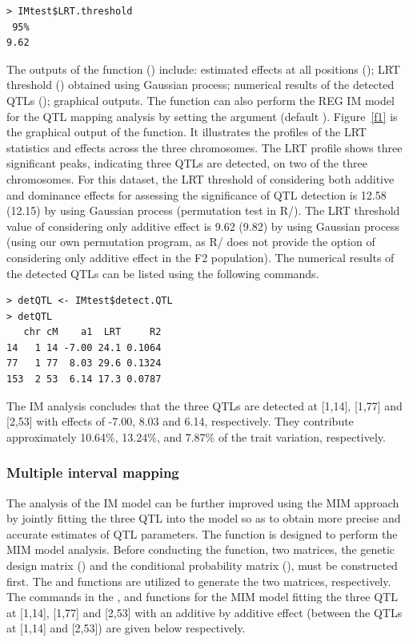 \begin{verbatim}
> IMtest$LRT.threshold
 95%
9.62
\end{verbatim}

\noindent The outputs of the  function () include: estimated effects at all positions ();  LRT threshold () obtained using Gaussian process; numerical results of the detected QTLs (); graphical outputs. The  function can also perform the REG IM model for the QTL mapping analysis by setting the argument  (default ). Figure~\ref{f1} is the graphical output of the  function. It illustrates the profiles of the LRT statistics and effects across the three chromosomes. The LRT profile shows three significant peaks, indicating three QTLs are detected, on two of the three chromosomes. For this dataset, the LRT threshold of considering both additive and dominance effects for assessing the significance of QTL detection is 12.58 (12.15) by using Gaussian process (permutation test in R/). The LRT threshold value of considering only additive effect is 9.62 (9.82) by using Gaussian process (using our own permutation program, as R/ does not provide the option of considering only additive effect in the F2 population). The numerical results of the detected QTLs can be listed using the following commands.

\begin{verbatim}
> detQTL <- IMtest$detect.QTL
> detQTL
   chr cM    a1  LRT     R2
14   1 14 -7.00 24.1 0.1064
77   1 77  8.03 29.6 0.1324
153  2 53  6.14 17.3 0.0787
\end{verbatim}

\noindent The IM analysis concludes that the three QTLs are detected at [1,14], [1,77] and [2,53] with effects of -7.00, 8.03 and 6.14, respectively. They contribute approximately 10.64\%, 13.24\%, and 7.87\% of the trait variation, respectively. 

\subsubsection{Multiple interval mapping}

The analysis of the IM model can be further improved using the MIM approach by jointly fitting the three QTL into the model so as to obtain more precise and accurate estimates of QTL parameters. The  function is designed to perform the MIM model analysis. Before conducting the  function, two matrices, the genetic design matrix () and the conditional probability matrix (), must be constructed first. The  and  functions are utilized to generate the two matrices, respectively. The commands in the ,  and  functions for the MIM model fitting the three QTL at [1,14], [1,77] and [2,53] with an additive by additive effect (between the QTLs at [1,14] and [2,53]) are given below respectively.


